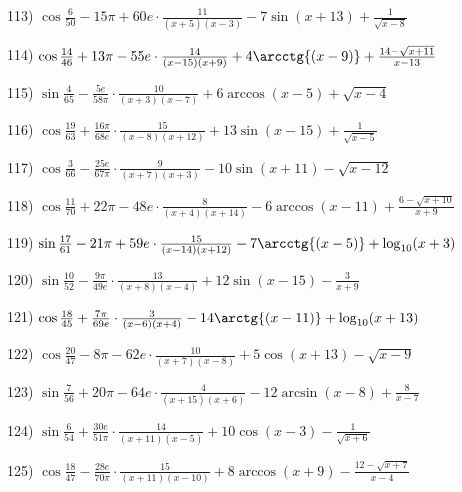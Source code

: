 \documentclass[11pt,ukrainian]{article}
\begin{document}
113) \space 
{ ${\cos\frac{6}{50}} - 15{\pi} + 60 e\cdot {\frac{11}{(x + 5)(x - 3)}} - {7\sin{(x + 13)}} + {\frac{1}{\sqrt{x - 8}}}$}
\smallskip\par
114) \space 
{ ${\cos\frac{14}{46}} + 13{\pi} - 55 e\cdot {\frac{14}{(x - 15)(x + 9)}} + {4\arcctg{(x - 9)}} + {\frac{14 - \sqrt{x + 11}}{x - 13}}$}
\smallskip\par
115) \space 
{ ${\sin\frac{4}{65}} - \frac{5 e}{58{\pi}}\cdot {\frac{10}{(x + 3)(x - 7)}} + {6\arccos{(x - 5)}} + {\sqrt{x - 4}}$}
\smallskip\par
116) \space 
{ ${\cos\frac{19}{63}} + \frac{16{\pi}}{68 e}\cdot {\frac{15}{(x - 8)(x + 12)}} + {13\sin{(x - 15)}} + {\frac{1}{\sqrt{x - 5}}}$}
\smallskip\par
117) \space 
{ ${\cos\frac{3}{66}} - \frac{25 e}{67{\pi}}\cdot {\frac{9}{(x + 7)(x + 3)}} - {10\sin{(x + 11)}} - {\sqrt{x - 12}}$}
\smallskip\par
118) \space 
{ ${\cos\frac{11}{70}} + 22{\pi} - 48 e\cdot {\frac{8}{(x + 4)(x + 14)}} - {6\arccos{(x - 11)}} + {\frac{6 - \sqrt{x + 10}}{x + 9}}$}
\smallskip\par
119) \space 
{ ${\sin\frac{17}{61}} - 21{\pi} + 59 e\cdot {\frac{15}{(x - 14)(x + 12)}} - {7\arcctg{(x - 5)}} + {\log_{10}(x + 3)}$}
\smallskip\par
120) \space 
{ ${\sin\frac{10}{52}} - \frac{9{\pi}}{49 e}\cdot {\frac{13}{(x + 8)(x - 4)}} + {12\sin{(x - 15)}} - { \frac{3}{x + 9}}$}
\smallskip\par
121) \space 
{ ${\cos\frac{18}{45}} + \frac{7{\pi}}{69 e}\cdot {\frac{3}{(x - 6)(x + 4)}} - {14\arctg{(x - 11)}} + {\log_{10}(x + 13)}$}
\smallskip\par
122) \space 
{ ${\cos\frac{20}{47}} - 8{\pi} - 62 e\cdot {\frac{10}{(x + 7)(x - 8)}} + {5\cos{(x + 13)}} - {\sqrt{x - 9}}$}
\smallskip\par
123) \space 
{ ${\sin\frac{7}{56}} + 20{\pi} - 64 e\cdot {\frac{4}{(x + 15)(x + 6)}} - {12\arcsin{(x - 8)}} + { \frac{8}{x - 7}}$}
\smallskip\par
124) \space 
{ ${\sin\frac{6}{54}} + \frac{30 e}{51{\pi}}\cdot {\frac{14}{(x + 11)(x - 5)}} + {10\cos{(x - 3)}} - {\frac{1}{\sqrt{x + 6}}}$}
\smallskip\par
125) \space 
{ ${\cos\frac{18}{47}} - \frac{28 e}{70{\pi}}\cdot {\frac{15}{(x + 11)(x - 10)}} + {8\arccos{(x + 9)}} - {\frac{12 - \sqrt{x + 7}}{x - 4}}$}
\end{document}
